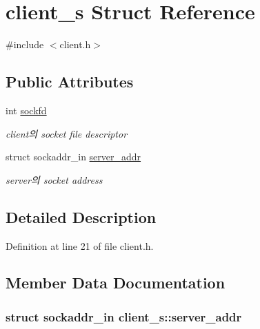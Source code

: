 \hypertarget{structclient__s}{\section{client\-\_\-s Struct Reference}
\label{structclient__s}
}


{\ttfamily \#include $<$client.\-h$>$}

\subsection*{Public Attributes}
\begin{DoxyCompactItemize}
\item 
int \hyperlink{structclient__s_a409a70b3071eaf5be18d0439d256756a}{sockfd}
\begin{DoxyCompactList}\small\item\em client의 socket file descriptor \end{DoxyCompactList}\item 
struct sockaddr\-\_\-in \hyperlink{structclient__s_a4cb8f28435762b205424d16ea39dcab3}{server\-\_\-addr}
\begin{DoxyCompactList}\small\item\em server의 socket address \end{DoxyCompactList}\end{DoxyCompactItemize}


\subsection{Detailed Description}


Definition at line 21 of file client.\-h.



\subsection{Member Data Documentation}
\hypertarget{structclient__s_a4cb8f28435762b205424d16ea39dcab3}{
\subsubsection[{server\-\_\-addr}]{\setlength{\rightskip}{0pt plus 5cm}struct sockaddr\-\_\-in client\-\_\-s\-::server\-\_\-addr}}\label{structclient__s_a4cb8f28435762b205424d16ea39dcab3}


